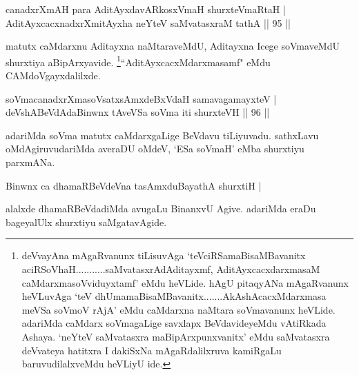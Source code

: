 \begin{shl}
canadxrXmAH para AditAyxdavARkosxVmaH shurxteVmaRtaH | \\
AditAyxcacxnadxrXmitAyxha neYteV saMvatasxraM tathA \hfill|| 95 || 
\end{shl}

\begin{artha}
matutx caMdarxnu Aditayxna naMtaraveMdU, Aditayxna Icege soVmaveMdU shurxtiya aBipArxyavide. \footnote[1]{deVvayAna mAgaRvanunx tiLisuvAga `teVciRSamaBisaMBavanitx aciRSoV\s haH...........saMvatasxrAdAditayxmf, AditAyxcacxdarxmasaM caMdarxmasoVviduyxtamf' eMdu heVLide. hAgU pitaqyANa mAgaRvanunx heVLuvAga `teV dhUmamaBisaMBavanitx.......AkAshAcacxMdarxmasa meVSa soVmoV rAjA' eMdu caMdarxna naMtara soVmavanunx heVLide. adariMda caMdarx soVmagaLige savxlapx BeVdavideyeMdu vAtiRkada Ashaya. `neYteV saMvatasxra maBipArxpunxvanitx' eMdu saMvatasxra deVvateya hatitxra I dakiSxNa mAgaRdalilxruva kamiRgaLu baruvudilalxveMdu heVLiyU ide.}``AditAyxcacxMdarxmasamf" eMdu CAMdoVgayxdalilxde.
\end{artha}


\begin{shl}
soVmacanadxrXmasoVsatxsAmxdeBxVdaH samavagamayxteV | \\
\footnotemark[1]deVshABeVdAdaBinwnx tAveVSa soVma iti shurxteVH \hfill|| 96 || 
\end{shl}

\begin{artha}
adariMda soVma matutx caMdarxgaLige BeVdavu tiLiyuvadu. sathxLavu 
oMdAgiruvudariMda averaDU oMdeV, `ESa soVmaH' eMba shurxtiyu parxmANa.
\end{artha}


\begin{shl}
Binwnx ca \footnotemark[2]dhamaRBeVdeVna tasAmxduBayathA shurxtiH | \\
\end{shl}

\begin{artha}
alalxde dhamaRBeVdadiMda avugaLu BinanxvU Agive. adariMda eraDu bageyalUlx shurxtiyu saMgatavAgide. 
\end{artha}

